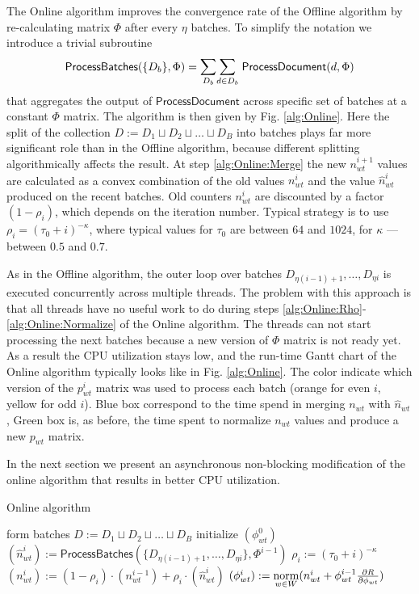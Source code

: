 \documentclass[russian,english]{llncs}
\newcommand{\norm}{\mathop{\rm norm}\limits}
\newcommand{\kw}[1]{\textsf{#1}}
\begin{document}
The \kw{Online algorithm} improves the convergence rate of the \kw{Offline algorithm}
by re-calculating matrix $\Phi$ after every $\eta$ batches.
To simplify the notation
we introduce a trivial subroutine
\[
\kw{ProcessBatches}(\{D_b\}, \Phi) = \mathlarger\sum\limits_{D_b} \mathlarger\sum\limits_{d \in D_b} \; \kw{ProcessDocument}(d, \Phi) \\
\]
that aggregates the output of $\kw{ProcessDocument}$ across specific set of batches at a constant $\Phi$ matrix.
The algorithm is then given by Fig. \ref{alg:Online}.
Here the split of the collection $D := D_1 \sqcup D_2 \sqcup \dots \sqcup D_B$
into batches
plays far more significant role than in the \kw{Offline algorithm},
because different splitting algorithmically affects the result.
At step \ref{alg:Online:Merge} the new $n_{wt}^{i+1}$ values are calculated as a convex combination
of the old values $n_{wt}^{i}$ and the value $\hat n_{wt}^{i}$ produced on the recent batches.
Old counters $n_{wt}^{i}$ are discounted by a factor $(1 - \rho_i)$,
which depends on the iteration number. Typical strategy is to use $\rho_i = (\tau_0 + i)^{-\kappa}$,
where typical values for $\tau_0$ are between $64$ and $1024$, for $\kappa$ --- between $0.5$ and $0.7$.

As in the \kw{Offline algorithm}, the outer loop over batches
$D_{\eta (i - 1) + 1}, \dots, D_{\eta i}$ is executed concurrently across multiple threads.
The problem with this approach is that all threads have no useful work to do during steps
\ref{alg:Online:Rho}-\ref{alg:Online:Normalize} of the \kw{Online algorithm}.
The threads can not start processing the next batches because a new version of $\Phi$ matrix is not ready yet.
As a result the CPU utilization stays low, and the run-time Gantt chart of the \kw{Online algorithm} typically looks like in Fig. \ref{alg:Online}.
The color indicate which version of the $p^i_{wt}$ matrix was used to process each batch
(orange for even $i$, yellow for odd $i$).
Blue box correspond to the time spend in merging $n_{wt}$ with $\hat n_{wt}$,
Green box is, as before, the time spent to normalize $n_{wt}$ values and produce a new $p_{wt}$ matrix.

In the next section we present an asynchronous non-blocking modification of the online algorithm that results in better CPU utilization.

\SetAlgoSkip{}
\begin{algorithm2e}[h]
\caption{Online algorithm} %
\label{alg:Online}
\BlankLine
{}
\BlankLine
form batches $D := D_1 \sqcup D_2 \sqcup \dots \sqcup D_B$\;
initialize $(\phi^0_{wt})$\;
 {
    $(\hat n^i_{wt}) := \kw{ProcessBatches}(\{D_{\eta (i - 1) + 1}, \dots, D_{\eta i}\}, \Phi^{i - 1})$\;
    $\rho_i := (\tau_0 + i)^{-\kappa}$\;
    \label{alg:Online:Rho}
    $(n^{i}_{wt}) := (1 - \rho_i) \cdot (n^{i-1}_{wt}) + \rho_i \cdot (\hat n^{i}_{wt})$\;
    \label{alg:Online:Merge}
    $(\phi^{i}_{wt}) := \norm_{w \in W} (n^{i}_{wt} + \phi^{i - 1}_{wt} \frac{\partial R}{\partial \phi_{wt}})$\;
    \label{alg:Online:Normalize}
}
\end{algorithm2e}
\end{document}
